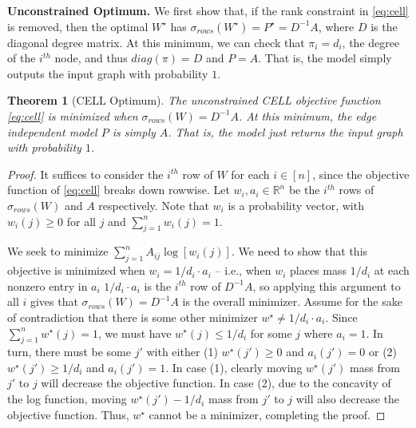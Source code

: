 \documentclass{article}
\newcommand{\todo}[1]{\textcolor{blue}{TODO: #1}}
\newtheorem{theorem}{Theorem}
\newcommand{\R}{\mathbb{R}}
\begin{document}
\noindent \textbf{Unconstrained Optimum.}
We first show that, if the rank constraint in \eqref{eq:cell} is removed, then the optimal $W^\star$ has $\sigma_{rows}(W^\star) = P^\star =  D^{-1} A$, where $D$ is the diagonal degree matrix. At this minimum, we can check that $\pi_i = d_i$, the degree of the $i^{th}$ node, and thus $diag(\pi)  = D$ and $P = A$. That is, the model simply outputs the input graph with probability $1$.  
\begin{theorem}[CELL Optimum]\label{thm:piecewise}
The unconstrained CELL objective function \eqref{eq:cell} is minimized when $\sigma_{rows}(W) = D^{-1} A$. At this minimum, the edge independent model $P$ is simply $A$. That is, the model just returns the input graph with probability $1$.
\end{theorem}
\begin{proof}
It suffices to consider the $i^{th}$ row of $W$ for each $i \in [n]$, since the objective function of \eqref{eq:cell} breaks down rowwise. Let $w_i,a_i \in \R^n$ be the $i^{th}$ rows of $\sigma_{rows}(W)$ and $A$ respectively. Note that $w_i$ is a probability vector, with $w_i(j) \ge 0$ for all $j$ and $\sum_{j=1}^n w_i(j) = 1$.

We seek to minimize $\sum_{j=1}^n A_{ij} \log [w_i(j)].$ We need to show that this objective is minimized when $w_i = 1/d_i \cdot a_i$ -- i.e., when $w_i$ places mass $1/d_i$ at each nonzero entry in $a_i$ $1/d_i \cdot a_i$ is the $i^{th}$ row of $D^{-1}A$, so applying this argument to all $i$ gives that $\sigma_{rows}(W) = D^{-1} A$ is the overall minimizer. Assume for the sake of contradiction that there is some other minimizer $w^\star \neq 1/d_i \cdot a_i$. Since $\sum_{j=1}^n w^\star(j) = 1$, we must have $w^\star(j) \le 1/d_i$ for some $j$ where $a_i = 1$. In turn, there must be some $j'$ with either (1) $w^\star(j') \ge 0$ and $a_i(j') = 0$ or (2) $w^\star(j') \ge 1/d_i$ and $a_i(j') = 1$. In case (1), clearly moving $w^\star(j')$ mass from $j'$ to $j$ will decrease the objective function. In case (2), due to the concavity of the log function, moving $w^\star(j') - 1/d_i$ mass from $j'$ to $j$ will also decrease the objective function. Thus, $w^\star$ cannot be a minimizer, completing the proof.
%
\end{proof}
\end{document}

